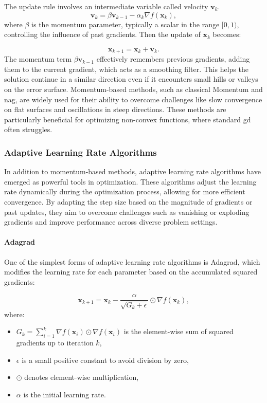 The update rule involves an intermediate variable called velocity $\mathbf{v}_k$.
\begin{equation*}
   \mathbf{v}_k = \beta \mathbf{v}_{k-1} - \alpha_k \nabla f(\mathbf{x}_k),
   \label{eq:momentum_v}
\end{equation*}
where $\beta$ is the momentum parameter, typically a scalar in the range \( [0, 1) \), controlling the influence of past gradients. Then the update of $\mathbf{x}_k$ becomes:

\begin{equation*}
\mathbf{x}_{k+1} = \mathbf{x}_k + \mathbf{v}_k.
\label{eq:momentum_update}
\end{equation*}
The momentum term $\beta \mathbf{v}_{k-1}$ effectively remembers previous gradients, adding them to the current gradient, which acts as a smoothing filter. This helps the solution continue in a similar direction even if it encounters small hills or valleys on the error surface. Momentum-based methods, such as classical Momentum and \ac{nag}, are widely used for their ability to overcome challenges like slow convergence on flat surfaces and oscillations in steep directions. These methods are particularly beneficial for optimizing non-convex functions, where standard \ac{gd} often struggles.

\subsubsection{Adaptive Learning Rate Algorithms}
\label{subsubsection:adaptive_learning_rates}
In addition to momentum-based methods, adaptive learning rate algorithms have emerged as powerful tools in optimization. These algorithms adjust the learning rate dynamically during the optimization process, allowing for more efficient convergence. By adapting the step size based on the magnitude of gradients or past updates, they aim to overcome challenges such as vanishing or exploding gradients and improve performance across diverse problem settings.

\paragraph{Adagrad}
One of the simplest forms of adaptive learning rate algorithms is Adagrad, which modifies the learning rate for each parameter based on the accumulated squared gradients:

\[
\mathbf{x}_{k+1} = \mathbf{x}_k - \frac{\alpha}{\sqrt{G_k + \epsilon}} \odot \nabla f(\mathbf{x}_k),
\]
where:
\begin{itemize}
    \item \( G_k = \sum_{i=1}^k \nabla f(\mathbf{x}_i) \odot \nabla f(\mathbf{x}_i) \) is the element-wise sum of squared gradients up to iteration \( k \),
    \item \( \epsilon \) is a small positive constant to avoid division by zero,
    \item \( \odot \) denotes element-wise multiplication,
    \item \( \alpha \) is the initial learning rate.
\end{itemize}

